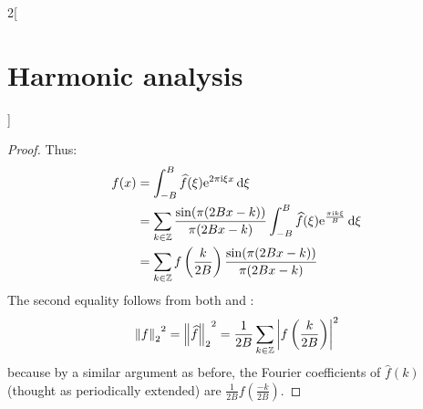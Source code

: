 \documentclass[../../../main_math.tex]{subfiles}
\begin{document}
\begin{multicols}{2}[\section{Harmonic analysis}]
\begin{proof}
    Thus:
    \begin{align*}
      f(x) & =\int_{-B}^{B}\widehat{f}(\xi)\mathrm{e}^{2\pi\mathrm{i} \xi x}\dd{\xi}                                                           \\
           & =\sum_{k\in\mathbb{Z}}\frac{\sin(\pi(2Bx-k))}{\pi(2Bx-k)}\int_{-B}^{B}\widehat{f}(\xi)\mathrm{e}^{\frac{\pi\mathrm{i} k\xi}{B}} \dd{\xi} \\
           & =\sum_{k\in\mathbb{Z}}f\left(\frac{k}{2B}\right)\frac{\sin(\pi(2Bx-k))}{\pi(2Bx-k)}
    \end{align*}
    The second equality follows from both  and :
    $${\left\|f\right\|_2}^2={\left\|\widehat{f}\right\|_2}^2=\frac{1}{2B}\sum_{k\in\mathbb{Z}}\abs{f\left(\frac{k}{2B}\right)}^2$$
    because by a similar argument as before, the Fourier coefficients of $\widehat{f}(k)$ (thought as periodically extended) are $\frac{1}{2B}f\left(\frac{-k}{2B}\right)$.
  \end{proof}

\end{multicols}
\end{document}
